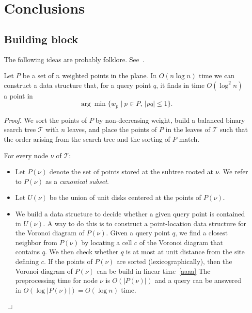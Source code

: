 \documentclass[a4paper,USenglish,numberwithinsect]{lipics}
\newcommand{\T}{\ensuremath{\mathcal{T}}}
\let\le\leqslant
\begin{document}
\section{Conclusions}
\label{sec:conclusions}









\newpage
\begin{appendix}

\section{Building block}

The following ideas are probably folklore. See~\cite{aa}.

\begin{lemma}
\label{le:ds2}
	Let $P$ be a set of $n$ weighted points in the plane.
	In $O(n\log n)$ time we can construct a data structure that,
	for a query point $q$, it finds in time $O(\log^2 n)$ a point in
	\[	\arg\min \{ w_p \mid p\in P,~|pq|\le 1\}.
	\]
\end{lemma}
\begin{proof}
	We sort the points of $P$ by non-decreasing weight, build
	a balanced binary search tree $\T$ with $n$ leaves, and place
	the points of $P$ in the leaves of $\T$ such that the order
	arising from the search tree and the sorting of $P$ match.
	
	For every node $\nu$ of $\T$:
	\begin{itemize}
		\item Let $P(\nu)$ denote the set of points stored at the subtree rooted at $\nu$.
			We refer to $P(\nu)$ as a \emph{canonical subset}.
		\item Let $U(\nu)$ be the union of unit disks centered at the points of $P(\nu)$.
		\item We build a data structure to decide whether a given query point
			is contained in $U(\nu)$. A way to do this is to construct
			a point-location data structure for the Voronoi diagram of $P(\nu)$.
			Given a query point $q$, we find a closest neighbor from $P(\nu)$
			by locating a cell $c$ of the Voronoi diagram that contains $q$.
			We then check whether $q$ is at most at unit distance from the site defining $c$. 
			If the points of $P(\nu)$ are sorted (lexicographically),
			then the Voronoi diagram of $P(\nu)$ can be build in linear time~\ref{aaaa}
			The preprocessing time for node $\nu$ is $O(|P(\nu)|)$ and a
			query can be answered in $O(\log |P(\nu)|)= O(\log n)$ time.
	\end{itemize}
	

\end{proof}
\end{appendix}
\end{document}
